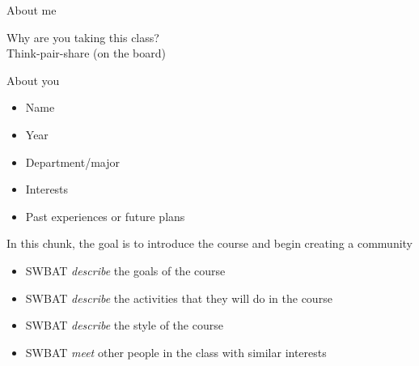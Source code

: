 \documentclass{beamer}
\newcommand{\goals}{
\begin{itemize}
\item SWBAT \emph{describe} the goals of the course
\item SWBAT \emph{describe} the activities that they will do in the course
\item SWBAT \emph{describe} the style of the course
\item SWBAT \emph{meet} other people in the class with similar interests
\end{itemize}
}
\begin{document}
\begin{frame}

About me

\end{frame}
\begin{frame}

Why are you taking this class?\\
Think-pair-share (on the board)

\end{frame}
\begin{frame}

About you
\begin{itemize}
\item Name
\item Year
\item Department/major
\item Interests
\item Past experiences or future plans
\end{itemize}

\end{frame}
\begin{frame}

In this chunk, the goal is to introduce the course and begin creating a community

\goals

\end{frame}


\end{document}
